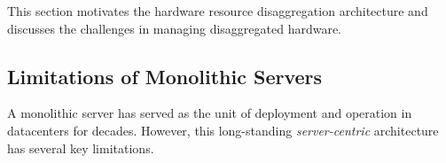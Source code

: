 \documentclass[10pt,times,twocolumn]{z2-article}
\begin{document}
This section %
motivates the hardware resource disaggregation architecture
and discusses the challenges in managing disaggregated hardware.

\subsection{Limitations of Monolithic Servers}
\label{sec:monolimit}

A monolithic server has served as the unit of deployment and operation in datacenters
for decades. %
However, this long-standing {\em server-centric} architecture has several key limitations.
\end{document}
